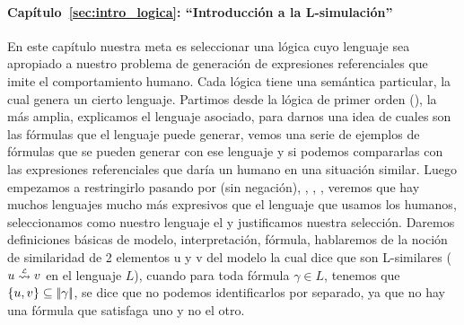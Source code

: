 \paragraph{Cap\'itulo~\ref{sec:intro_logica}: ``Introducci\'on a la L-simulaci\'on''} En este cap\'itulo nuestra meta es seleccionar una l\'ogica cuyo lenguaje sea apropiado a nuestro problema de generaci\'on de expresiones referenciales que imite el comportamiento humano. Cada l\'ogica tiene una sem\'antica particular, la cual genera un cierto lenguaje. Partimos desde la l\'ogica de primer orden (\FOL), la m\'as amplia, explicamos el lenguaje asociado, para darnos una idea de cuales son las f\'ormulas que el lenguaje puede generar, vemos una serie de ejemplos de f\'ormulas que se pueden generar con ese lenguaje y si podemos compararlas con las expresiones referenciales que dar\'ia un humano en una situaci\'on similar. 
Luego empezamos a restringirlo pasando por \EPFOL (\FOL sin negaci\'on), \ALC, \EL, \ELAN, veremos que hay muchos lenguajes mucho m\'as expresivos que el lenguaje 
que usamos los humanos, seleccionamos como nuestro lenguaje el \EL y justificamos nuestra selecci\'on. Daremos definiciones b\'asicas de 
modelo, interpretaci\'on, f\'ormula, hablaremos de la noci\'on de similaridad de 2 elementos u y v del modelo la cual dice que son 
L-similares ($u \simil{\+L} v$ en el lenguaje $L$), cuando para toda f\'ormula $\gamma \in L$, tenemos que $\{u,v\} \subseteq 
|\!|\gamma|\!|$, se dice que no podemos identificarlos por separado, ya que no hay una f\'ormula que satisfaga uno y no el otro. 
%

